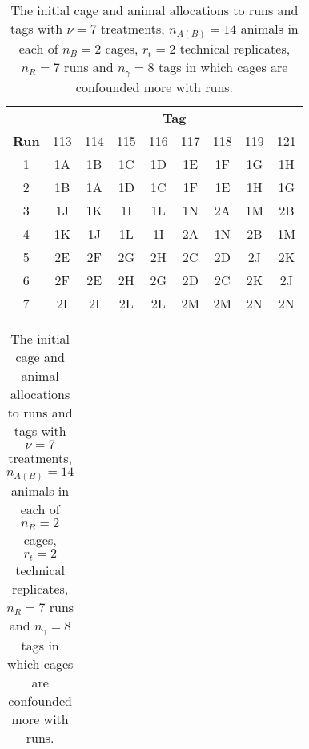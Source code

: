 \begin{table}[h!]                                            
\centering 
\itshape                                                  
\caption{The initial cage and animal allocations to runs and tags with $\nu = 7$ treatments, $n_{A(B)} = 14$ animals in each of $n_B = 2$ cages, $r_t = 2$ technical replicates, $n_R = 7$ runs and $n_\gamma = 8$ tags in which cages are confounded more with runs.}                
\begin{tabular}[t]{c|cccccccc}                                      
 & \multicolumn{8}{c}{{\bf Tag}} \\                          
{\bf Run}  &  \textnormal{113} &  \textnormal{114} &  \textnormal{115} &  \textnormal{116} &  \textnormal{117} &  \textnormal{118} &  \textnormal{119} &  \textnormal{121}\\ \hline                                                    
\textnormal{1} & 1A & 1B & 1C & 1D & 1E & 1F & 1G & 1H \\
\textnormal{2} & 1B & 1A & 1D & 1C & 1F & 1E & 1H & 1G \\
\textnormal{3} & 1J & 1K & 1I & 1L & 1N & 2A & 1M & 2B \\
\textnormal{4} & 1K & 1J & 1L & 1I & 2A & 1N & 2B & 1M \\
\textnormal{5} & 2E & 2F & 2G & 2H & 2C & 2D & 2J & 2K \\
\textnormal{6} & 2F & 2E & 2H & 2G & 2D & 2C & 2K & 2J \\
\textnormal{7} & 2I & 2I & 2L & 2L & 2M & 2M & 2N & 2N \\                                               
\end{tabular}                                                
\label{tab:cagDes7}                                       
 
\begin{tabular}{l}
\\	
\end{tabular} 
                                          

\end{table}
